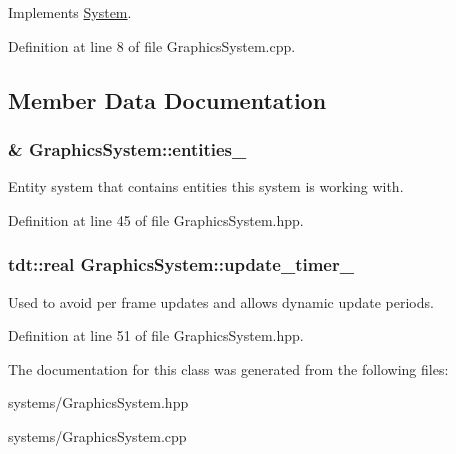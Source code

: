 Implements \hyperlink{class_system_a6d54c9bd38eb43d620a1451cb0925472}{System}.



Definition at line 8 of file Graphics\+System.\+cpp.



\subsection{Member Data Documentation}
\subsubsection[{\texorpdfstring{entities\+\_\+}{entities_}}]{\& Graphics\+System\+::entities\+\_\+\hspace{0.3cm}{\ttfamily [private]}}\hypertarget{class_graphics_system_ad0471df508e2dc91c475c7460c406023}{}\label{class_graphics_system_ad0471df508e2dc91c475c7460c406023}


Entity system that contains entities this system is working with. 



Definition at line 45 of file Graphics\+System.\+hpp.

\subsubsection[{\texorpdfstring{update\+\_\+timer\+\_\+}{update_timer_}}]{\setlength{\rightskip}{0pt plus 5cm}tdt\+::real Graphics\+System\+::update\+\_\+timer\+\_\+\hspace{0.3cm}{\ttfamily [private]}}\hypertarget{class_graphics_system_a6100fb67478a56b5c3fb9d994f1a8c0e}{}\label{class_graphics_system_a6100fb67478a56b5c3fb9d994f1a8c0e}


Used to avoid per frame updates and allows dynamic update periods. 



Definition at line 51 of file Graphics\+System.\+hpp.



The documentation for this class was generated from the following files\+:\begin{DoxyCompactItemize}
\item 
systems/Graphics\+System.\+hpp\item 
systems/Graphics\+System.\+cpp\end{DoxyCompactItemize}
